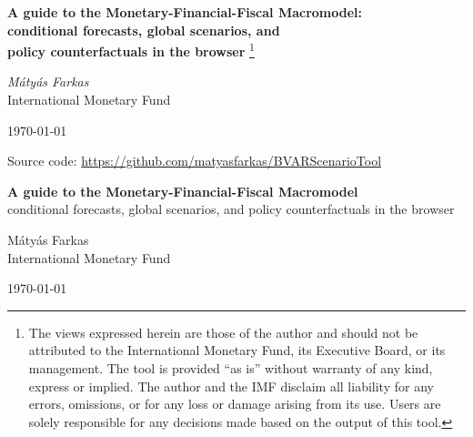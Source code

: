 \documentclass[11pt]{article}
\theoremstyle{plain}
\theoremstyle{remark}
\begin{document}
\begin{titlepage}
\vspace*{3cm}
\begin{center}
{\LARGE\bfseries A guide to the Monetary-Financial-Fiscal Macromodel:\\[4pt]
 conditional forecasts, global scenarios, and\\[2pt] policy counterfactuals in the browser}%
\footnote{The views expressed herein are those of the author and should
not be attributed to the International Monetary Fund, its Executive
Board, or its management.  The tool is provided ``as is'' without
warranty of any kind, express or implied.  The author and the IMF
disclaim all liability for any errors, omissions, or for any loss or
damage arising from its use.  Users are solely responsible for any
decisions made based on the output of this tool.}

\vspace{1.2cm}

{\large\itshape M\'aty\'as Farkas}\\[4pt]
International Monetary Fund

\vspace{1.5cm}

\today

\vspace{1.5cm}

Source code: \url{https://github.com/matyasfarkas/BVARScenarioTool}

\end{center}
\vfill
\end{titlepage}

\begin{center}
{\LARGE\bfseries A guide to the Monetary-Financial-Fiscal Macromodel}\\[6pt]
{\large conditional forecasts, global scenarios, and policy counterfactuals in the browser}
\end{center}

\vspace{0.6cm}
\begin{center}
M\'aty\'as Farkas\\
International Monetary Fund
\end{center}
\begin{center}
\today
\end{center}
\end{document}
